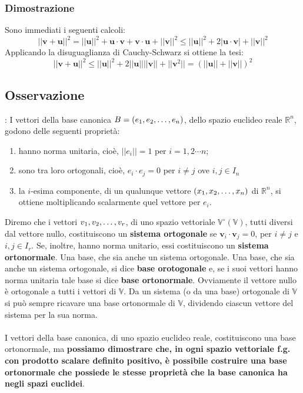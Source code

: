 \documentclass[../main.tex]{subfiles}
\begin{document}
\subsubsection{Dimostrazione}
Sono immediati i seguenti calcoli:
\[
    ||\textbf{v}+\textbf{u}||^2=||\textbf{u}||^2+\textbf{u}\cdot\textbf{v}+\textbf{v}\cdot\textbf{u}+||\textbf{v}||^2\leq||\textbf{u}||^2+2|\textbf{u}\cdot\textbf{v}|+||\textbf{v}||^2
\]
Applicando la disuguaglianza di Cauchy-Schwarz si ottiene la tesi:
\[
    ||\textbf{v}+\textbf{u}||^2\leq||\textbf{u}||^2+2||\textbf{u}|| ||\textbf{v}||+||\textbf{v}^2||=(||\textbf{u}||+||\textbf{v}||)^2
\]

\subsection{Osservazione}:
I vettori della base canonica $B = (e_1, e_2, \ldots, e_{n})$, dello spazio euclideo reale $\mathbb{R}^n$, godono delle seguenti proprietà:
\begin{enumerate}
    \item hanno norma unitaria, cioè, $||e_i||=1 \text{ per } i=1,2\cdots n$;
    \item sono tra loro ortogonali, cioè, $e_i\cdot e_j = 0$ per $i\ne j$ ove $i, j\in
              I_n$
    \item la $i$-esima componente, di un qualunque vettore $(x_1, x_2, \ldots, x_{n})$ di
          $\mathbb{R}^n$, si ottiene moltiplicando scalarmente quel vettore per $e_i$.
\end{enumerate}
Diremo che i vettori $v_1, v_2, \ldots, v_{r}$, di uno spazio vettoriale
$\mathbb{V}^{\circ}(\mathbb{V})$, tutti diversi dal vettore nullo,
costituiscono un \textbf{sistema ortogonale} se $\textbf{v}_i\cdot\textbf{v}_j
    = 0$, per $i\ne j $ e $i,j\in I_r$. Se, inoltre, hanno norma unitario, essi
costituiscono un \textbf{sistema ortonormale}. Una base, che sia anche un
sistema ortogonale. Una base, che sia anche un sistema ortogonale, si dice
\textbf{base orotogonale} e, se i suoi vettori hanno norma unitaria tale base
si dice \textbf{base ortonormale}. Ovviamente il vettore nullo è ortogonale a
tutti i vettori di $\mathbb{V}$. Da un sistema (o da una base) ortogonale di
$\mathbb{V}$ si può sempre ricavare una base ortonormale di $\mathbb{V}$,
dividendo ciascun vettore del sistema per la sua norma.\\ \\ I vettori della
base canonica, di uno spazio euclideo reale, costituiscono una base
ortonormale, ma \textbf{possiamo dimostrare che, in ogni spazio vettoriale f.g.
    con prodotto scalare definito positivo, è possibile costruire una base
    ortonormale che possiede le stesse proprietà che la base canonica ha negli
    spazi euclidei}.
\end{document}
